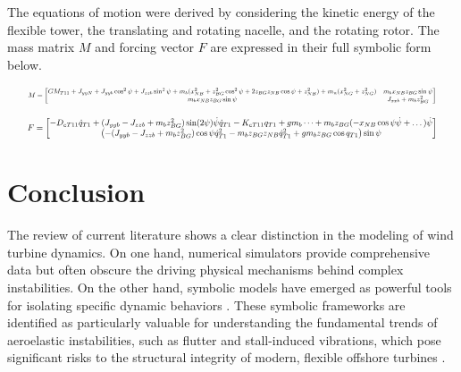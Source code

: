 \documentclass[onecolumn,draftcls]{IEEEtran}
\begin{document}
The equations of motion were derived by considering the kinetic energy of the flexible tower, the translating and rotating nacelle, and the rotating rotor. The mass matrix $M$ and forcing vector $F$ are expressed in their full symbolic form below.

\begin{equation}
    \label{eq:flex_tower_mass_matrix}
    \resizebox{0.95\textwidth}{!}{%
    $M = \begin{bmatrix}
        GM_{T11} + J_{yyN} + J_{yyb} \cos^{2}\psi + J_{zzb} \sin^{2}\psi + m_{b}(x_{NB}^{2} + z_{BG}^{2} \cos^{2}\psi + 2 z_{BG} z_{NB} \cos\psi + z_{NB}^{2}) + m_{n}(x_{NG}^{2} + z_{NG}^{2}) & m_{b} x_{NB} z_{BG} \sin\psi \\
        m_{b} x_{NB} z_{BG} \sin\psi & J_{xxb} + m_{b} z_{BG}^{2}
    \end{bmatrix}$%
    }
\end{equation}

\begin{equation} 
    \label{eq:flex_tower_forcing_terms}
    \resizebox{0.95\textwidth}{!}{%
    $F = \begin{bmatrix}
        - D_{eT11} \dot{q}_{T1} + (J_{yyb} - J_{zzb} + m_{b} z_{BG}^{2}) \sin(2\psi) \dot{\psi} \dot{q}_{T1} - K_{eT11} q_{T1} + g m_{b} \dots + m_{b} z_{BG} ( - x_{NB} \cos\psi \dot{\psi} + \dots) \dot{\psi} \\
        \left( - (J_{yyb} - J_{zzb} + m_{b} z_{BG}^{2}) \cos\psi \dot{q}_{T1}^{2} - m_{b} z_{BG} z_{NB} \dot{q}_{T1}^{2} + g m_{b} z_{BG} \cos q_{T1} \right) \sin\psi
    \end{bmatrix}$%
    }
\end{equation}

\section{Conclusion}
The review of current literature shows a clear distinction in the modeling of wind turbine dynamics. On one hand, numerical simulators provide comprehensive data but often obscure the driving physical mechanisms behind complex instabilities. On the other hand, symbolic models have emerged as powerful tools for isolating specific dynamic behaviors \cite{branlard2022symbolic}. These symbolic frameworks are identified as particularly valuable for understanding the fundamental trends of aeroelastic instabilities, such as flutter and stall-induced vibrations, which pose significant risks to the structural integrity of modern, flexible offshore turbines \cite{hansen2007aeroelastic}.
\end{document}
